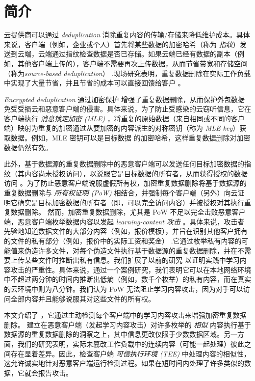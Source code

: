 \section{简介}
\label{sec:featurespy-intro}

云提供商可以通过 {\em deduplication} \cite{harnik10} 消除重复内容的传输/存储来降低维护成本。具体来说，客户端（例如，企业或个人）首先将某些数据的加密哈希（称为 {\em 指纹}）发送到云端，云端通过指纹检查数据是否已存储。如果云端已经有数据的副本（例如，其他客户端上传的），客户端不需要再次上传数据，从而节省带宽和存储空间（称为{\em source-based deduplication}） .现场研究表明，重复数据删除在实际工作负载 \cite{jin09, meyer11, wallace12} 中实现了大量节省，并且节省的成本可以直接回馈给客户 \cite{bellare13b, armknecht15}。


{\em Encrypted deduplication} 通过加密保护 \cite{bellare13a, halevi11} 增强了重复数据删除，从而保护外包数据免受受损云和恶意客户端的侵害。具体来说，为了防止受感染的云窃听信息，它在客户端执行 {\em 消息锁定加密 (MLE)} \cite{bellare13a}，将重复的原始数据（来自相同或不同的客户端）映射为重复的加密通过从要加密的内容派生的对称密钥（称为 {\em MLE key}）获取数据。例如，MLE 密钥可以是目标数据 \cite{douceur02} 的加密哈希，这样重复数据删除对加密数据仍然有效。

此外，基于数据源的重复数据删除中的恶意客户端可以发送任何目标加密数据的指纹（其内容尚未授权访问），以说服它是目标数据的所有者，从而获得授权的数据访问 \cite{ halevi11,mulazzani11}。为了防止恶意客户端说服虚假所有权，加密重复数据删除将基于数据源的重复数据删除与 {\em 所有权证明 (PoW)} \cite{halevi11} 相结合，并强制每个客户端（另外）向云证明它确实是目标加密数据的所有者（即，可以完全访问内容）并被授权对其执行重复数据删除。
然而，加密重复数据删除，尤其是 PoW 不足以完全击败恶意客户端，恶意客户端枚举数据内容以发起 {\em learning-content 攻击} \cite{harnik10, zuo18}。具体来说，攻击者先验地知道数据文件的大部分内容（例如，报价模板），并旨在识别其他客户拥有的文件的私有部分（例如，报价中的实际工资和奖金） .它通过枚举私有内容的可能值来伪造许多文件，对每个伪造文件执行基于数据源的重复数据删除，并在不需要上传某些文件时推断出私有信息。我们扩展了以前的研究 \cite{harnik10, zuo18} 以证明实践中学习内容攻击的严重性。具体来说，通过一个案例研究，我们表明它可以在本地网络环境中不超过两分钟的时间内推断出低熵（例如，数千个枚举）的私有内容，而在真实的云环境中则为八分钟。我们认为 PoW 无法阻止学习内容攻击，因为对手可以访问全部内容并且能够说服其对这些文件的所有权。


本文介绍了 \sysnameF，它通过主动检测每个客户端中的学习内容攻击来增强加密重复数据删除。 \sysnameF 建立在恶意客户端（发起学习内容攻击）对许多枚举的 {\em 相似} 内容执行基于数据源的重复数据删除的洞察之上，其中信息更改仅限于少数数据区域。另一方面，我们的研究表明，实际未篡改工作负载中的连续内容（可能一起处理）彼此之间存在显着差异。因此，\sysnameF 检查客户端 {\em 可信执行环境 (TEE)} \cite{sgx} 中处理内容的相似性，这允许诚实地针对恶意客户端运行检测过程。如果在短时间内处理了许多类似的数据，它就会报告攻击。



